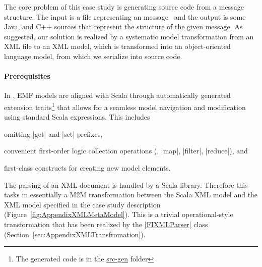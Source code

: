 
\label{sec:SolutionDescription}

\enlargethispage{20mm}

The core problem of this case study is generating source code from a \FIXML message structure.
The input is a file representing an  message~\cite{FIXML2004} and the output is some Java, \Csharp and C++ sources that represent the structure of the given \FIXML message. 
As suggested, our solution is realized by a systematic model transformation from an XML file to an XML model, which is transformed into an object-oriented language model, from which we serialize into source code.

\vspace*{-5mm}
\paragraph{Prerequisites}
%
In \SIGMA, EMF models are aligned with Scala through automatically generated extension traits\footnote{The generated code is in the \href{https://github.com/fikovnik/ttc14-fixml-sigma/blob/master/ttc14-fixml-base/src-gen}{src-gen} folder} that allows for a seamless model navigation and modification using standard Scala expressions.
This includes
%
\begin{inparaitem}[]
  \item omitting \Scala|get| and \Scala|set| prefixes,
  \item convenient first-order logic collection operations (\Eg, \Scala|map|, \Scala|filter|, \Scala|reduce|), and
  \item first-class constructs for creating new model elements.
\end{inparaitem}


The parsing of an XML document is handled by a Scala library. 
Therefore this tasks in essentially a M2M transformation between the Scala XML model and the XML model specified in the case study description (\Cf Figure~\ref{fig:AppendixXMLMetaModel}).
This is a trivial operational-style transformation that has been realized by the \href{https://github.com/fikovnik/ttc14-fixml-sigma/blob/master/ttc14-fixml-base/src/fr/inria/spirals/sigma/ttc14/fixml/FIXMLParser.scala}{\Scala|FIXMLParser|} class (\Cf Section~\ref{sec:AppendixXMLTransfromation}).


